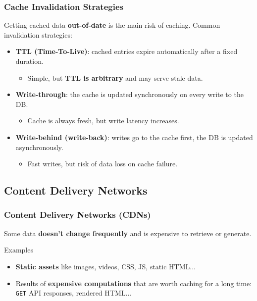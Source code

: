\documentclass{beamer}
\begin{document}
\begin{frame}
  \frametitle{Cache Invalidation Strategies}

  Getting cached data \textbf{out-of-date} is the main risk of caching. Common invalidation strategies:

  \begin{itemize}
    \item \textbf{TTL (Time-To-Live)}: cached entries expire automatically after a fixed duration.
    \begin{itemize}
      \item Simple, but \textbf{TTL is arbitrary} and may serve stale data.
    \end{itemize}
    \item \textbf{Write-through}: the cache is updated synchronously on every write to the DB.
    \begin{itemize}
      \item Cache is always fresh, but write latency increases.
    \end{itemize}
    \item \textbf{Write-behind (write-back)}: writes go to the cache first, the DB is updated asynchronously.
    \begin{itemize}
      \item Fast writes, but risk of data loss on cache failure.
    \end{itemize}
  \end{itemize}

\end{frame}

\subsection{Content Delivery Networks}

\begin{frame}
  \frametitle{Content Delivery Networks (CDNs)}

  Some data \textbf{doesn't change frequently} and is expensive to retrieve or generate.
  \newline

  \begin{block}{Examples}
    \begin{itemize}
      \item \textbf{Static assets} like images, videos, CSS, JS, static HTML...
      \item Results of \textbf{expensive computations} that are worth caching for a long time: \texttt{GET} API responses, rendered HTML...
    \end{itemize}

  \end{block}

\end{frame}
\end{document}
